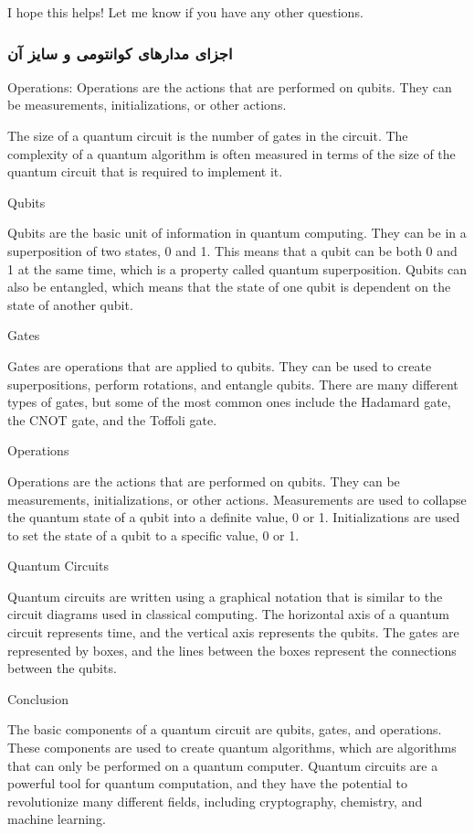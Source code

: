 \documentclass{book}
\begin{document}
I hope this helps! Let me know if you have any other questions.


\subsubsection{اجزای مدار‌های کوانتومی و سایز آن }
Operations: Operations are the actions that are performed on qubits. They can be measurements, initializations, or other actions.


The size of a quantum circuit is the number of gates in the circuit. The complexity of a quantum algorithm is often measured in terms of the size of the quantum circuit that is required to implement it.


Qubits

Qubits are the basic unit of information in quantum computing. They can be in a superposition of two states, 0 and 1. This means that a qubit can be both 0 and 1 at the same time, which is a property called quantum superposition. Qubits can also be entangled, which means that the state of one qubit is dependent on the state of another qubit.

Gates

Gates are operations that are applied to qubits. They can be used to create superpositions, perform rotations, and entangle qubits. There are many different types of gates, but some of the most common ones include the Hadamard gate, the CNOT gate, and the Toffoli gate.

Operations

Operations are the actions that are performed on qubits. They can be measurements, initializations, or other actions. Measurements are used to collapse the quantum state of a qubit into a definite value, 0 or 1. Initializations are used to set the state of a qubit to a specific value, 0 or 1.

Quantum Circuits

Quantum circuits are written using a graphical notation that is similar to the circuit diagrams used in classical computing. The horizontal axis of a quantum circuit represents time, and the vertical axis represents the qubits. The gates are represented by boxes, and the lines between the boxes represent the connections between the qubits.

Conclusion

The basic components of a quantum circuit are qubits, gates, and operations. These components are used to create quantum algorithms, which are algorithms that can only be performed on a quantum computer. Quantum circuits are a powerful tool for quantum computation, and they have the potential to revolutionize many different fields, including cryptography, chemistry, and machine learning.
\end{document}
